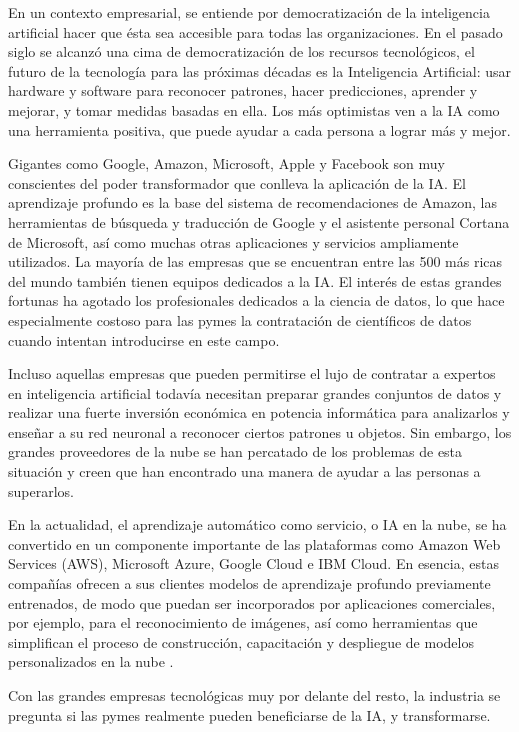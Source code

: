 En un contexto empresarial, se entiende por democratización de la inteligencia artificial hacer que ésta sea accesible para todas las organizaciones. En el pasado siglo se alcanzó una cima de democratización de los recursos tecnológicos, el futuro de la tecnología para las próximas décadas es la Inteligencia Artificial: usar hardware y software para reconocer patrones, hacer predicciones, aprender y mejorar, y tomar medidas basadas en ella. Los más optimistas ven a la IA como una herramienta positiva, que puede ayudar a cada persona a lograr más y mejor.

Gigantes como Google, Amazon, Microsoft, Apple y Facebook son  muy conscientes del poder transformador que conlleva la aplicación de la IA. El aprendizaje profundo es la base del sistema de recomendaciones de Amazon, las herramientas de búsqueda y traducción de Google y el asistente personal Cortana de Microsoft, así como muchas otras aplicaciones y servicios ampliamente utilizados. La mayoría de las empresas que se encuentran entre las 500 más ricas del mundo también tienen equipos dedicados a la IA. El interés de estas grandes fortunas ha agotado los profesionales dedicados a la ciencia de datos, lo que hace especialmente costoso para las pymes la contratación de científicos de datos cuando intentan introducirse en este campo.

Incluso aquellas empresas que pueden permitirse el lujo de contratar a expertos en inteligencia artificial todavía necesitan preparar grandes conjuntos de datos y realizar una fuerte inversión económica en potencia informática para analizarlos y enseñar a su red neuronal a reconocer ciertos patrones u objetos. Sin embargo, los grandes proveedores de la nube se han percatado de los problemas de esta situación y creen que han encontrado una manera de ayudar a las personas a superarlos.

En la actualidad, el aprendizaje automático como servicio, o IA en la nube, se ha convertido en un componente importante de las plataformas como Amazon Web Services (AWS), Microsoft Azure, Google Cloud e IBM Cloud. En esencia, estas compañías ofrecen a sus clientes modelos de aprendizaje profundo previamente entrenados, de modo que puedan ser incorporados por aplicaciones comerciales, por ejemplo, para el reconocimiento de imágenes, así como herramientas que simplifican el proceso de construcción, capacitación y despliegue de modelos personalizados en la nube . 

Con las grandes empresas tecnológicas muy por delante del resto, la industria se pregunta si las pymes realmente pueden beneficiarse de la IA, y transformarse.

